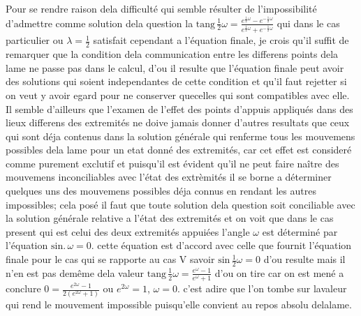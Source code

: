 \documentclass[11pt,a4paper]{article}
\begin{document}
Pour se rendre raison dela difficulté qui semble résulter de l'impossibilité d'admettre
comme solution dela question la  
$\text{tang}\,\frac{1}{2}\omega=\frac{e^{\frac{1}{2}\omega}-e^{-\frac{1}{2}\omega}}{e^{\frac{1}{2}\omega}+e^{-\frac{1}{2}\omega}}$ qui dans le cas particulier
ou $\lambda=\frac{1}{2}$ satisfait cependant a l'équation finale, je crois qu'il suffit de remarquer
que la condition dela communication entre les differens points dela lame ne passe
pas dans le calcul, d'ou il resulte que l'équation finale peut avoir des solutions
qui soient independantes de cette condition et qu'il faut rejetter si on veut y
avoir egard pour ne conserver quecelles qui sont compatibles avec elle. Il semble
 d'ailleurs que l'examen de l'effet des points d'appuis appliqués dans
des lieux differens des extremités ne doive jamais donner d'autres resultats que
ceux qui sont déja contenus dans la solution générale qui renferme tous les
mouvemens possibles dela lame pour un etat donné des extremités, car cet effet
est consideré comme purement exclutif et puisqu'il est évident qu'il ne peut faire
naître des mouvemens inconciliables avec l'état des extrèmités il se borne a
déterminer quelques uns des mouvemens possibles déja connus en rendant les
autres impossibles; cela posé il faut que toute solution dela question soit
conciliable avec la solution générale relative a l'état des extremités et on voit
que dans le cas present qui est celui des deux extremités appuiées l'angle $\omega$
est déterminé par l'équation $\text{sin.}\,\omega=0$. cette équation est d'accord avec celle
que fournit l'équation finale pour le cas qui se rapporte au cas V savoir
$\text{sin}\,\frac{1}{2}\omega=0$ d'ou resulte
mais il n'en est pas demême dela valeur $\text{tang}\,\frac{1}{2}\omega=\frac{e^{\omega}-1}{e^{\omega}+1}$ d'ou on tire
car on est mené a conclure $0=\frac{e^{2\omega}-1}{2(e^{2\omega}+1)}$ ou $e^{2\omega}=1$, $\omega=0$. c'est adire
que l'on tombe sur lavaleur qui rend le mouvement impossible puisqu'elle
convient au repos absolu delalame.
\end{document}
